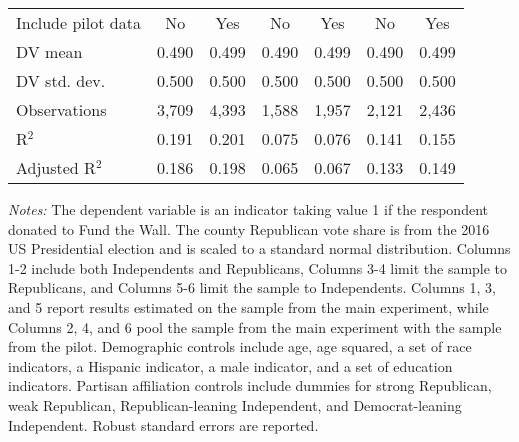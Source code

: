 \begin{table}[!htbp]
\begin{threeparttable}
\begin{tabular}{@{\hspace{5pt}}l@{\hspace{5pt}}cccccc}
\midrule
Include pilot data & No & Yes & No & Yes & No & Yes \\
\addlinespace
DV mean & 0.490 & 0.499 & 0.490 & 0.499 & 0.490 & 0.499 \\
DV std. dev. & 0.500 & 0.500 & 0.500 & 0.500 & 0.500 & 0.500 \\
Observations & 3,709 & 4,393 & 1,588 & 1,957 & 2,121 & 2,436 \\ 
R$^{2}$ & 0.191 & 0.201 & 0.075 & 0.076 & 0.141 & 0.155 \\ 
Adjusted R$^{2}$ & 0.186 & 0.198 & 0.065 & 0.067 & 0.133 & 0.149 \\ 
\bottomrule 
\end{tabular} 
\begin{tablenotes}
\footnotesize
\item \textit{Notes:} The dependent variable is an indicator taking value 1 if the respondent donated to Fund the Wall. The county Republican vote share is from the 2016 US Presidential election and is scaled to a standard normal distribution. Columns 1-2 include both Independents and Republicans, Columns 3-4 limit the sample to Republicans, and Columns 5-6 limit the sample to Independents. Columns 1, 3, and 5 report results estimated on the sample from the main experiment, while Columns 2, 4, and 6 pool the sample from the main experiment with the sample from the pilot. Demographic controls include age, age squared, a set of race indicators, a Hispanic indicator, a male indicator, and a set of education indicators. Partisan affiliation controls include dummies for strong Republican, weak Republican, Republican-leaning Independent, and Democrat-leaning Independent. Robust standard errors are reported.
\end{tablenotes}
\end{threeparttable}
\end{table} 
